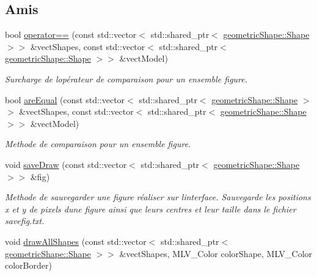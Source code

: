 \subsection*{Amis}
\begin{DoxyCompactItemize}
\item 
bool \hyperlink{classgeometric_shape_1_1_shape_a29f20507a47833482b3cee839a972f66}{operator==} (const std\+::vector$<$ std\+::shared\+\_\+ptr$<$ \hyperlink{classgeometric_shape_1_1_shape}{geometric\+Shape\+::\+Shape} $>$$>$ \&vect\+Shapes, const std\+::vector$<$ std\+::shared\+\_\+ptr$<$ \hyperlink{classgeometric_shape_1_1_shape}{geometric\+Shape\+::\+Shape} $>$$>$ \&vect\+Model)
\begin{DoxyCompactList}\small\item\em Surcharge de l\textquotesingle{}opérateur de comparaison pour un ensemble figure. \end{DoxyCompactList}\item 
bool \hyperlink{classgeometric_shape_1_1_shape_ac837cd47c70c0ba96f33db9ae57e4f5a}{are\+Equal} (const std\+::vector$<$ std\+::shared\+\_\+ptr$<$ \hyperlink{classgeometric_shape_1_1_shape}{geometric\+Shape\+::\+Shape} $>$$>$ \&vect\+Shapes, const std\+::vector$<$ std\+::shared\+\_\+ptr$<$ \hyperlink{classgeometric_shape_1_1_shape}{geometric\+Shape\+::\+Shape} $>$$>$ \&vect\+Model)
\begin{DoxyCompactList}\small\item\em Methode de comparaison pour un ensemble figure. \end{DoxyCompactList}\item 
void \hyperlink{classgeometric_shape_1_1_shape_a011759ae83f40587e0f422f2730ecbd4}{save\+Draw} (const std\+::vector$<$ std\+::shared\+\_\+ptr$<$ \hyperlink{classgeometric_shape_1_1_shape}{geometric\+Shape\+::\+Shape} $>$$>$ \&fig)
\begin{DoxyCompactList}\small\item\em Methode de sauvegarder une figure réaliser sur l\textquotesingle{}interface. Sauvegarde les positions x et y de pixels d\textquotesingle{}une figure ainsi que leurs centres et leur taille dans le fichier savefig.\+txt. \end{DoxyCompactList}\item 
void \hyperlink{classgeometric_shape_1_1_shape_a6fa8a7bdf815401f5956bf4a02ecf544}{draw\+All\+Shapes} (const std\+::vector$<$ std\+::shared\+\_\+ptr$<$ \hyperlink{classgeometric_shape_1_1_shape}{geometric\+Shape\+::\+Shape} $>$$>$ \&vect\+Shapes, M\+L\+V\+\_\+\+Color color\+Shape, M\+L\+V\+\_\+\+Color color\+Border)

\end{DoxyCompactItemize}
